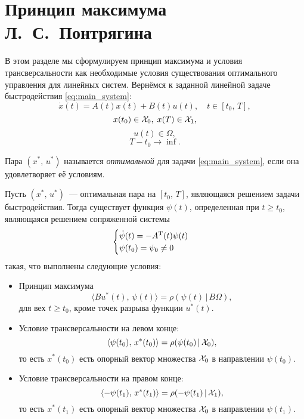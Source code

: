 \section{Принцип максимума Л.~С.~Понтрягина}

В этом разделе мы сформулируем принцип максимума и условия трансверсальности как необходимые условия существования оптимального управления для линейных систем. Вернёмся к заданной линейной задаче быстродействия \eqref{eq:main_system}:
$$
        \dot x(t) = A(t)x(t) + B(t)u(t),\quad t \in [t_0,\,T],
$$
$$
        x(t_0) \in \mathcal{X}_0,\; x(T) \in \mathcal{X}_1,
$$
$$
        u(t) \in \Omega,
$$
$$
        T - t_0 \rightarrow \inf.
$$

\begin{definition}
        Пара $(x^*,\,u^*)$ называется \textit{оптимальной} для задачи \eqref{eq:main_system}, если она удовлетворяет её условиям.
\end{definition}

\begin{theorem}
        Пусть $(x^*,\,u^*)$~--- оптимальная пара на $[t_0,\,T]$, являющаяся решением задачи быстродействия. Тогда существует функция $\psi(t)$, определенная при $t \geqslant t_0$, являющаяся решением сопряженной системы
        $$
                \begin{cases}
                        \dot\psi(t) = -A^{\mathrm{T}}(t)\psi(t)\\
                        \psi(t_0) = \psi_0 \neq 0
                \end{cases}
        $$ 
        такая, что выполнены следующие условия:

        \begin{itemize}
                \item Принцип максимума
                $$
                        \langle Bu^*(t),\,\psi(t)\rangle = \rho(\psi(t)\,|\,B\Omega),
                $$
                для вех $t \geqslant t_0$, кроме точек разрыва функции $u^*(t)$.

                \item Условие трансверсальности на левом конце:
                $$
                        \langle \psi(t_0),\,x^*(t_0)\rangle = \rho(\psi(t_0)\,|\,\mathcal{X}_0),
                $$
                то есть $x^*(t_0)$ есть опорный вектор множества $\mathcal{X}_0$ в направлении $\psi(t_0)$.

                \item Условие трансверсальности на правом конце:
                $$
                        \langle -\psi(t_1),\,x^*(t_1)\rangle = \rho(-\psi(t_1)\,|\,\mathcal{X}_1),
                $$
                то есть $x^*(t_1)$ есть опорный вектор множества $\mathcal{X}_0$ в направлении $\psi(t_1)$.
        \end{itemize}
\end{theorem}